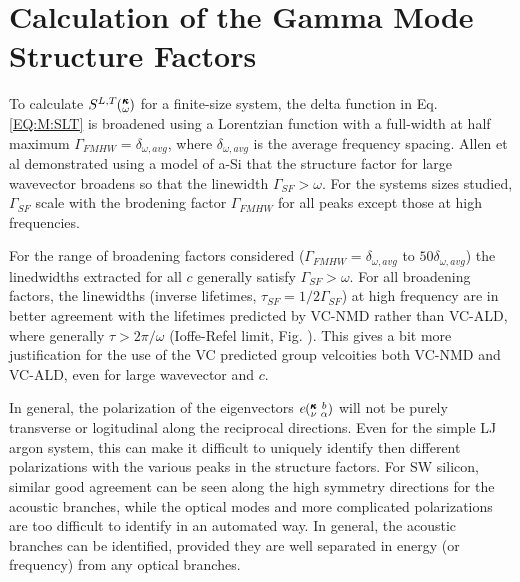 \documentclass[aps,prb,twocolumn,superscriptaddress,amsmath,amssymb,floatfix]{revtex4}
\newcommand{\kvba}{\mspace{-4.0mu}\left(\mspace{-8.0mu}
\begin{smallmatrix} &\pmb{\kappa} &b \\ &\nu &\alpha\end{smallmatrix}
\mspace{-3.0mu}\right)}
\newcommand{\kw}{\mspace{-4.0mu}\left(\mspace{-8.0mu}
\begin{smallmatrix}&\pmb{\kappa} \\&\omega\end{smallmatrix}
\mspace{-3.0mu}\right)}
\begin{document}
\section{\label{A:SF}Calculation of the Gamma Mode Structure Factors}

To calculate 
$S^{L,T}\kw$ for a finite-size system, the 
delta function in Eq. \eqref{EQ:M:SLT} is broadened using a Lorentzian 
function with a full-width at half maximum 
$\Gamma_{FMHW} = \delta_{\omega,avg}$, 
where 
$\delta_{\omega,avg}$ is the average frequency spacing. 
Allen et al\cite{allen_diffusons_1999} 
demonstrated using a model of 
a-Si that the structure factor 
for large wavevector broadens so that the 
linewidth $\Gamma_{SF} > \omega$.
\cite{taraskin_determination_1999}
For the systems sizes studied, $\Gamma_{SF}$ 
scale with the brodening factor 
$\Gamma_{FMHW}$ for all peaks 
except those at high frequencies. 

For the range of broadening factors 
considered ($\Gamma_{FMHW} = \delta_{\omega,avg}$ to $50\delta_{\omega,avg}$) 
the linedwidths extracted for all $c$ 
generally satisfy $\Gamma_{SF} > \omega$. 
For all broadening factors, the linewidths 
(inverse lifetimes, $\tau_{SF} = 1/2\Gamma_{SF}$) 
at high frequency are in better 
agreement with the lifetimes predicted 
by VC-NMD rather than VC-ALD,
where generally $\tau > 2\pi/\omega$ (Ioffe-Refel limit, Fig. ).
\cite{taraskin_determination_1999} This gives a bit more  
justification for the use of the VC predicted group velcoities 
both VC-NMD and VC-ALD, even for large wavevector and $c$. 

In general, the polarization of the eigenvectors $e\kvba$ will not 
be purely transverse or logitudinal along the reciprocal directions. 
Even for the simple LJ argon system, this can make it difficult to 
uniquely identify then different polarizations with the various 
peaks in the structure factors. For SW silicon, similar good agreement 
can be seen along the high symmetry directions for the acoustic branches, 
while the optical modes 
and more complicated polarizations are too difficult to identify in 
an automated way. 
In general, the acoustic branches can be identified, provided they are 
well separated in energy (or frequency) from any optical branches.
\cite{feldman_numerical_1999,thomas_predicting_2010} 

\end{document}

